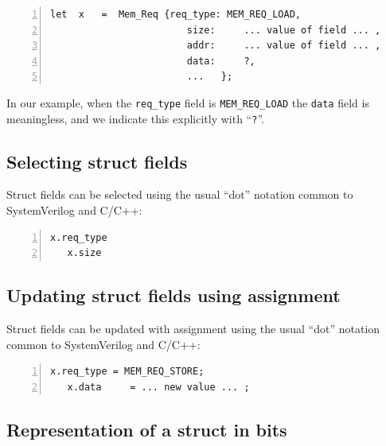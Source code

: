 {\footnotesize
\begin{Verbatim}[frame=single, numbers=left]
   let  x   =  Mem_Req {req_type: MEM_REQ_LOAD,
                        size:     ... value of field ... ,
                        addr:     ... value of field ... ,
                        data:     ?,
                        ...   };
\end{Verbatim}
}

In our example, when the \verb|req_type| field is \verb|MEM_REQ_LOAD|
the \verb|data| field is meaningless, and we indicate this explicitly
with ``\verb|?|''.


\subsection{Selecting struct fields}


Struct fields can be selected using the usual ``dot'' notation common
to SystemVerilog and C/C++:

{\footnotesize
\begin{Verbatim}[frame=single, numbers=left]
   x.req_type
   x.size
\end{Verbatim}
}


\subsection{Updating struct fields using assignment}


Struct fields can be updated with assignment using the usual ``dot''
notation common to SystemVerilog and C/C++:

{\footnotesize
\begin{Verbatim}[frame=single, numbers=left]
   x.req_type = MEM_REQ_STORE;
   x.data     = ... new value ... ;
\end{Verbatim}
}


\subsection{Representation of a struct in bits}

